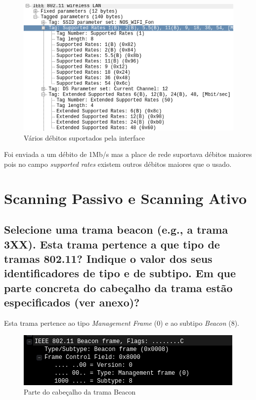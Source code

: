 \documentclass[a4paper]{article}
\begin{document}
\begin{figure}[H]
\centering
\includegraphics[scale=0.50]{pics/p3-2.png}
\caption{Vários débitos suportados pela interface}
\end{figure}
Foi enviada a um débito de 1Mb/s mas a place de rede suportava débitos maiores pois no campo \textit{supported rates} existem outros débitos maiores que o usado.
 

\section{Scanning Passivo e Scanning Ativo}
\setcounter{subsection}{3}

\subsection{Selecione uma trama beacon (e.g., a trama 3XX). Esta trama pertence a que tipo
de tramas 802.11? Indique o valor dos seus identificadores de tipo e de subtipo.
Em que parte concreta do cabeçalho da trama estão especificados (ver anexo)?}

Esta trama pertence ao tipo \textit{Management Frame} (0) e ao subtipo \textit{Beacon} (8). 
\begin{figure}[H]
\centering
\includegraphics[scale=0.50]{pics/p4.png}
\caption{Parte do cabeçalho da trama Beacon}
\end{figure}
\end{document}
